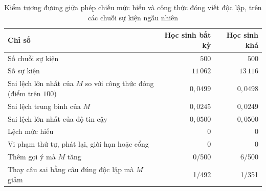 \begin{table}[H]
\centering
\caption{Kiểm tương đương giữa phép chiếu mức hiểu và công thức đóng viết độc lập, trên các chuỗi sự kiện ngẫu nhiên}\label{tab:learner-conformance}
\small
\begin{tabular}{p{7.4cm}rr}
\toprule
Chỉ số & Học sinh bất kỳ & Học sinh khá \\
\midrule
Số chuỗi sự kiện & $500$ & $500$ \\
Số sự kiện & $11\,062$ & $13\,116$ \\
Sai lệch lớn nhất của $M$ so với công thức đóng (điểm trên $100$) & $0{,}0499$ & $0{,}0498$ \\
Sai lệch trung bình của $M$ & $0{,}0245$ & $0{,}0249$ \\
Sai lệch lớn nhất của độ tin cậy & $0{,}0500$ & $0{,}0500$ \\
Lệch mức hiểu & $0$ & $0$ \\
Vi phạm thứ tự, phát lại, giới hạn hoặc cổng & $0$ & $0$ \\
Thêm gợi ý mà $M$ tăng & 0/500 & 6/500 \\
Thay câu sai bằng câu đúng độc lập mà $M$ giảm & 1/492 & 1/351 \\
\bottomrule
\end{tabular}
\end{table}
